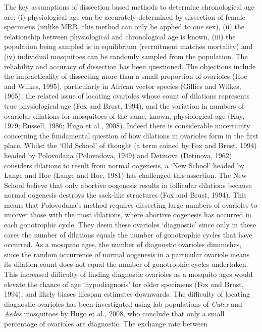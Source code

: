 \documentclass[]{article}
\begin{document}
The key assumptions of dissection based methods to determine
chronological age are: (i) physiological age can be accurately
determined by dissection of female specimens (unlike MRR, this method
can only be applied to one sex), (ii) the relationship between
physiological and chronological age is known, (iii) the population being
sampled is in equilibrium (recruitment matches mortality) and (iv)
individual mosquitoes can be randomly sampled from the population. The
reliability and accuracy of dissection has been questioned. The
objections include the impracticality of dissecting more than a small
proportion of ovarioles (Hoc and Wilkes, 1995), particularly in African
vector species (Gillies and Wilkes, 1965), the related issue of locating
ovarioles whose count of dilations represents true physiological age
(Fox and Brust, 1994), and the variation in numbers of ovariolar
dilations for mosquitoes of the same, known, physiological age (Kay,
1979; Russell, 1986; Hugo et al., 2008). Indeed there is considerable
uncertainty concerning the fundamental question of how dilations in
ovarioles form in the first place. Whilst the `Old School' of thought (a
term coined by Fox and Brust, 1994) headed by Polovodana (Polovodova,
1949) and Detinova (Detinova, 1962) considers dilations to result from
normal oogenesis, a `New School' headed by Lange and Hoc (Lange and Hoc,
1981) has challenged this assertion. The New School believe that only
abortive oogenesis results in follicular dilations because normal
oogenesis destroys the sack-like structures (Fox and Brust, 1994). This
means that Polovodana's method requires dissecting large numbers of
ovarioles to uncover those with the most dilations, where abortive
oogenesis has occurred in each gonotrophic cycle. They deem these
ovarioles `diagnostic' since only in these cases the number of dilations
equals the number of gonotrophic cycles that have occurred. As a
mosquito ages, the number of diagnostic ovarioles diminishes, since the
random occurrence of normal oogenesis in a particular ovariole means its
dilation count does not equal the number of gonotrophic cycles
undertaken. This increased difficulty of finding diagnostic ovarioles as
a mosquito ages would elevate the chance of age `hypodiagnosis' for
older specimens (Fox and Brust, 1994), and likely biases lifespan
estimates downwards. The difficulty of locating diagnostic ovarioles has
been investigated using lab populations of \emph{Culex} and \emph{Aedes}
mosquitoes by Hugo et al., 2008, who conclude that only a small
percentage of ovarioles are diagnostic. The exchange rate between
\end{document}
